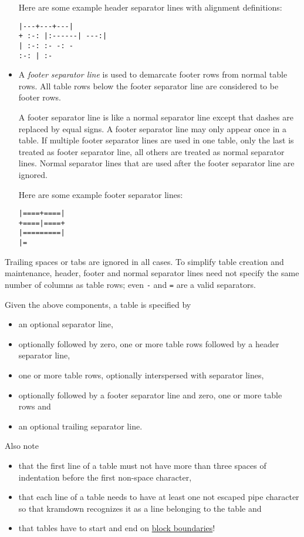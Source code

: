 \documentclass[a4paper]{article}
\begin{document}
\begin{itemize}
  Here are some example header separator lines with alignment
  definitions:

\begin{verbatim}
|---+---+---|
+ :-: |:------| ---:|
| :-: :- -: -
:-: | :-
\end{verbatim}
\item
  A \emph{footer separator line} is used to demarcate footer rows from
  normal table rows. All table rows below the footer separator line are
  considered to be footer rows.

  A footer separator line is like a normal separator line except that
  dashes are replaced by equal signs. A footer separator line may only
  appear once in a table. If multiple footer separator lines are used in
  one table, only the last is treated as footer separator line, all
  others are treated as normal separator lines. Normal separator lines
  that are used after the footer separator line are ignored.

  Here are some example footer separator lines:

\begin{verbatim}
|====+====|
+====|====+
|=========|
|=
\end{verbatim}
\end{itemize}

Trailing spaces or tabs are ignored in all cases. To simplify table
creation and maintenance, header, footer and normal separator lines need
not specify the same number of columns as table rows; even
\texttt{\textbar{}-} and \texttt{\textbar{}=} are a valid separators.

Given the above components, a table is specified by

\begin{itemize}
\item
  an optional separator line,
\item
  optionally followed by zero, one or more table rows followed by a
  header separator line,
\item
  one or more table rows, optionally interspersed with separator lines,
\item
  optionally followed by a footer separator line and zero, one or more
  table rows and
\item
  an optional trailing separator line.
\end{itemize}

Also note

\begin{itemize}
\item
  that the first line of a table must not have more than three spaces of
  indentation before the first non-space character,
\item
  that each line of a table needs to have at least one not escaped pipe
  character so that kramdown recognizes it as a line belonging to the
  table and
\item
  that tables have to start and end on
  \protect\hyperlink{block-boundaries}{block boundaries}!
\end{itemize}
\end{document}
